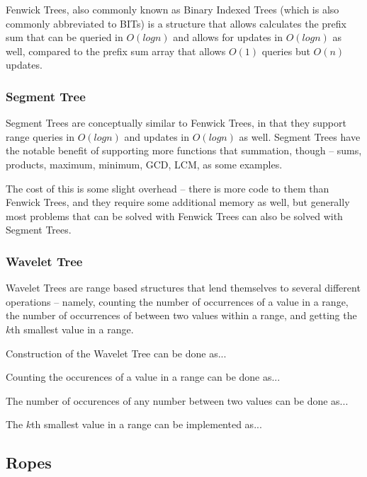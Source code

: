 Fenwick Trees, also commonly known as Binary Indexed Trees (which is also commonly abbreviated to BITs) is a structure that allows calculates the prefix sum that can be queried in $O(log n)$ and allows for updates in $O(log n)$ as well, compared to the prefix sum array that allows $O(1)$ queries but $O(n)$ updates.

\subsubsection{Segment Tree}

Segment Trees are conceptually similar to Fenwick Trees, in that they support range queries in $O(log n)$ and updates in $O(log n)$ as well. Segment Trees have the notable benefit of supporting more functions that summation, though -- sums, products, maximum, minimum, GCD, LCM, as some examples.

The cost of this is some slight overhead -- there is more code to them than Fenwick Trees, and they require some additional memory as well, but generally most problems that can be solved with Fenwick Trees can also be solved with Segment Trees.

\subsubsection{Wavelet Tree}

Wavelet Trees are range based structures that lend themselves to several different operations -- namely, counting the number of occurrences of a value in a range, the number of occurrences of between two values within a range, and getting the $k$th smallest value in a range.

Construction of the Wavelet Tree can be done as...

Counting the occurences of a value in a range can be done as...

The number of occurences of any number between two values can be done as...

The $k$th smallest value in a range can be implemented as...

\subsection{Ropes}
